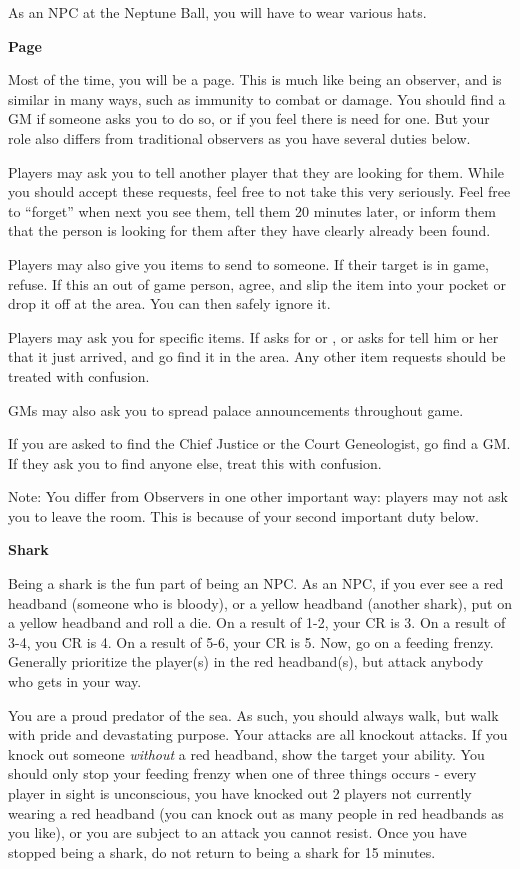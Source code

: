 \documentclass[green]{NeptuneBall}
\begin{document}
\name{\gNPC{}}

As an NPC at the Neptune Ball, you will have to wear various hats.

{\bf Page}

Most of the time, you will be a page. This is much like being an observer, and is similar in many ways, such as immunity to combat or damage. You should find a GM if someone asks you to do so, or if you feel there is need for one. But your role also differs from traditional observers as you have several duties below.

Players may ask you to tell another player that they are looking for them. While you should accept these requests, feel free to not take this very seriously. Feel free to "`forget"' when next you see them, tell them 20 minutes later, or inform them that the person is looking for them after they have clearly already been found. 

Players may also give you items to send to someone. If their target is in game, refuse. If this an out of game person, agree, and slip the item into your pocket or drop it off at the \pGM{} area. You can then safely ignore it.

Players may ask you for specific items. If \cPriest{} asks for \iCipherLetter{} or \iBaby{}, or \cSpy{} asks for \iScroll{} tell him or her that it just arrived, and go find it in the \pGM{} area. Any other item requests should be treated with confusion.

GMs may also ask you to spread palace announcements throughout game.

If you are asked to find the Chief Justice or the Court Geneologist, go find a GM. If they ask you to find anyone else, treat this with confusion.

Note: You differ from Observers in one other important way: players may not ask you to leave the room. This is because of your second important duty below.

{\bf Shark}

Being a shark is the fun part of being an NPC. As an NPC, if you ever see a red headband (someone who is bloody), or a yellow headband (another shark), put on a yellow headband and roll a die. On a result of 1-2, your CR is 3. On a result of 3-4, you CR is 4. On a result of 5-6, your CR is 5. Now, go on a feeding frenzy. Generally prioritize the player(s) in the red headband(s), but attack anybody who gets in your way. 

You are a proud predator of the sea. As such, you should always walk, but walk with pride and devastating purpose. Your attacks are all knockout attacks. If you knock out someone \emph{without} a red headband, show the target your \aShark{} ability. You should only stop your feeding frenzy when one of three things occurs - every player in sight is unconscious, you have knocked out 2 players not currently wearing a red headband (you can knock out as many people in red headbands as you like), or you are subject to an attack you cannot resist. Once you have stopped being a shark, do not return to being a shark for 15 minutes.
\end{document}
